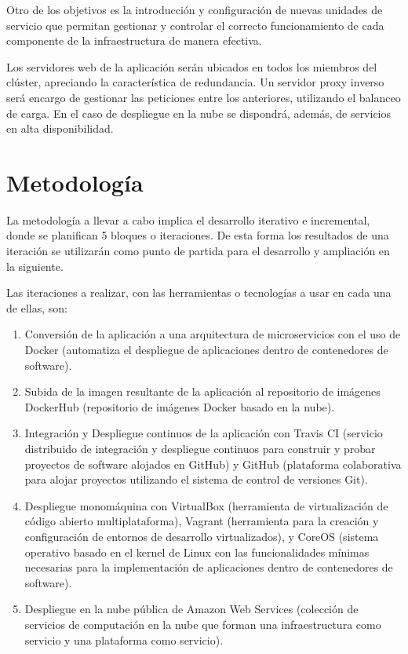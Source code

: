 Otro de los objetivos es la introducción y configuración de nuevas unidades de servicio que permitan gestionar y controlar el correcto funcionamiento de cada componente de la infraestructura de manera efectiva.

Los servidores web de la aplicación serán ubicados en todos los miembros del clúster, apreciando la característica de redundancia. Un servidor proxy inverso será encargo de gestionar las peticiones entre los anteriores, utilizando el balanceo de carga. En el caso de despliegue en la nube se dispondrá, además, de servicios en alta disponibilidad.

\section{Metodología}

La metodología a llevar a cabo implica el desarrollo iterativo e incremental, donde se planifican 5 bloques o iteraciones. De esta forma los resultados de una iteración se utilizarán como punto de partida para el desarrollo y ampliación en la siguiente. 

Las iteraciones a realizar, con las herramientas o tecnologías a usar en cada una de ellas, son:
\begin{enumerate}
\item Conversión de la aplicación a una arquitectura de microservicios con el uso de Docker (automatiza el despliegue de aplicaciones dentro de contenedores de software).
\item Subida de la imagen resultante de la aplicación al repositorio de imágenes DockerHub (repositorio de imágenes Docker basado en la nube).
\item Integración y Despliegue continuos de la aplicación con Travis CI (servicio distribuido de integración y despliegue continuos para construir y probar proyectos de software alojados en GitHub) y GitHub (plataforma colaborativa para alojar proyectos utilizando el sistema de control de versiones Git).
\item Despliegue monomáquina con VirtualBox (herramienta de virtualización de código abierto multiplataforma), Vagrant (herramienta para la creación y configuración de entornos de desarrollo virtualizados), y CoreOS (sistema operativo basado en el kernel de Linux con las funcionalidades mínimas necesarias para la implementación de aplicaciones dentro de contenedores de software).
\item Despliegue en la nube pública de Amazon Web Services (colección de servicios de computación en la nube que forman una infraestructura como servicio y una plataforma como servicio).
\end{enumerate}

